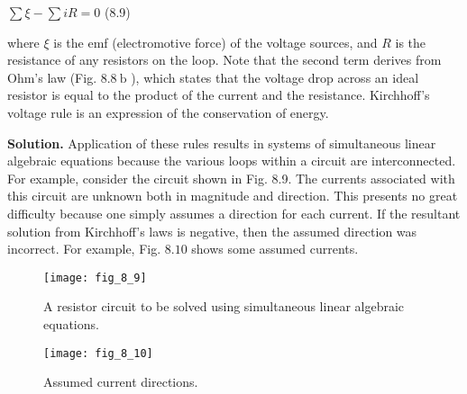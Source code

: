 \documentclass[../main.tex]{subfiles}
\begin{document}
\bigskip
$\sum \xi-\sum i R=0$ \hfill{(8.9)}
\bigskip

where $\xi$ is the emf (electromotive force) of the voltage sources, and $R$ is the resistance of any resistors on the loop. Note that the second term derives from Ohm's law (Fig. $8.8 \mathrm{~b}$ ), which states that the voltage drop across an ideal resistor is equal to the product of the current and the resistance. Kirchhoff's voltage rule is an expression of the conservation of energy.

\noindent\textbf{Solution.} Application of these rules results in systems of simultaneous linear algebraic equations because the various loops within a circuit are interconnected. For example, consider the circuit shown in Fig. 8.9. The currents associated with this circuit are unknown both in magnitude and direction. This presents no great difficulty because one simply assumes a direction for each current. If the resultant solution from Kirchhoff's laws is negative, then the assumed direction was incorrect. For example, Fig. $8.10$ shows some assumed currents.

\begin{multicols}{2}

    \begin{figure}[H]
        \centering
        \texttt{[image: fig\_8\_9]}
        \caption{\textsf{A resistor circuit to be solved using simultaneous
        linear algebraic equations.}}
        \label{fig:fig_8_9}
    \end{figure}
    
    \begin{figure}[H]
        \centering
        \texttt{[image: fig\_8\_10]}
        \caption{\textsf{Assumed current directions.}}
        \label{fig:fig_8_10}
    \end{figure}
    
\end{multicols}
\end{document}
